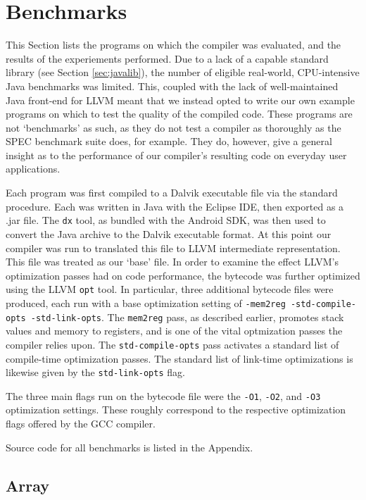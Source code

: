 \section{Benchmarks}
\label{sec:benchmarks}

This Section lists the programs on which the compiler was evaluated, and the results of the experiements performed. Due to a lack of a capable standard library (see Section \ref{sec:javalib}), the number of eligible real-world, CPU-intensive Java benchmarks was limited. This, coupled with the lack of well-maintained Java front-end for LLVM meant that we instead opted to write our own example programs on which to test the quality of the compiled code. These programs are not `benchmarks' as such, as they do not test a compiler as thoroughly as the SPEC benchmark suite does, for example. They do, however, give a general insight as to the performance of our compiler's resulting code on everyday user applications.

Each program was first compiled to a Dalvik executable file via the standard procedure. Each was written in Java with the Eclipse IDE, then exported as a .jar file. The \verb|dx| tool, as bundled with the Android SDK, was then used to convert the Java archive to the Dalvik executable format. At this point our compiler was run to translated this file to LLVM intermediate representation. This file was treated as our `base' file. In order to examine the effect LLVM's optimization passes had on code performance, the bytecode was further optimized using the LLVM \verb|opt| tool. In particular, three additional bytecode files were produced, each run with a base optimization setting of \verb|-mem2reg -std-compile-opts -std-link-opts|. The \verb|mem2reg| pass, as described earlier, promotes stack values and memory to registers, and is one of the vital optmization passes the compiler relies upon. The \verb|std-compile-opts| pass activates a standard list of compile-time optimization passes. The standard list of link-time optimizations is likewise given by the \verb|std-link-opts| flag.

The three main flags run on the bytecode file were the \verb|-O1|, \verb|-O2|, and \verb|-O3| optimization settings. These roughly correspond to the respective optimization flags offered by the GCC compiler.

Source code for all benchmarks is listed in the Appendix.

\subsection*{Array}

